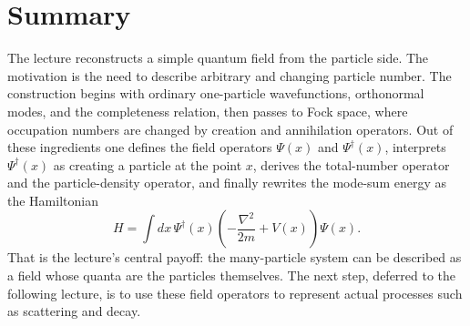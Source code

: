 \section{Summary}

The lecture reconstructs a simple quantum field from the particle side. The motivation is the need to describe arbitrary and changing particle number. The construction begins with ordinary one-particle wavefunctions, orthonormal modes, and the completeness relation, then passes to Fock space, where occupation numbers are changed by creation and annihilation operators. Out of these ingredients one defines the field operators $\Psi(x)$ and $\Psi^\dagger(x)$, interprets $\Psi^\dagger(x)$ as creating a particle at the point $x$, derives the total-number operator and the particle-density operator, and finally rewrites the mode-sum energy as the Hamiltonian
\begin{equation}
H=\int dx\,\Psi^\dagger(x)\left(-\frac{\nabla^2}{2m}+V(x)\right)\Psi(x).
\end{equation}
That is the lecture's central payoff: the many-particle system can be described as a field whose quanta are the particles themselves. The next step, deferred to the following lecture, is to use these field operators to represent actual processes such as scattering and decay.